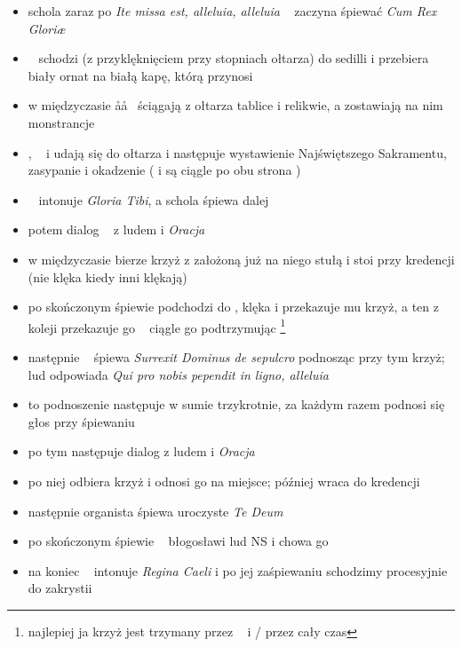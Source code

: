 \begin{itemize}
	\item schola zaraz po \textit{Ite missa est, alleluia, alleluia} \ii~
	      zaczyna śpiewać \textit{Cum Rex Glori\ae}
	\item \ii~ schodzi (z przyklęknięciem przy stopniach ołtarza) do sedilli i
	      przebiera biały ornat na białą kapę, którą przynosi \zz
	\item w międzyczasie \aa\aa~ ściągają z ołtarza tablice i relikwie, a
	      zostawiają na nim monstrancje
	\item {}, \ii~ i  udają się do ołtarza i następuje wystawienie
	      Najświętszego Sakramentu, zasypanie i okadzenie ( i  są ciągle
	      po obu strona \ii)
	\item \ii~ intonuje \textit{Gloria Tibi}, a schola śpiewa dalej
	\item potem dialog \ii~ z ludem i \textit{Oracja}
	\item w międzyczasie  bierze krzyż z założoną już na niego stułą i
	      stoi przy kredencji (nie klęka kiedy inni klękają)
	\item po skończonym śpiewie  podchodzi do , klęka i przekazuje
	      mu krzyż, a ten z koleji przekazuje go \ii~ ciągle go podtrzymując
		  \footnote{najlepiej ja krzyż jest trzymany przez \ii~ i / przez cały czas}
	\item następnie \ii~ śpiewa \textit{Surrexit Dominus de sepulcro} podnosząc
	      przy tym krzyż; lud odpowiada \textit{Qui pro nobis pependit in ligno,
		      alleluia}
	\item to podnoszenie następuje w sumie trzykrotnie, za każdym razem podnosi
	      się głos przy śpiewaniu
	\item po tym następuje dialog z ludem i \textit{Oracja}
	\item po niej  odbiera krzyż i odnosi go na miejsce; później wraca
	      do kredencji
	\item następnie organista śpiewa uroczyste \textit{Te Deum}
	\item po skończonym śpiewie \ii~ błogosławi lud NS i chowa go
	\item na koniec \ii~ intonuje \textit{Regina Caeli} i po jej zaśpiewaniu
	      schodzimy procesyjnie do zakrystii
\end{itemize}